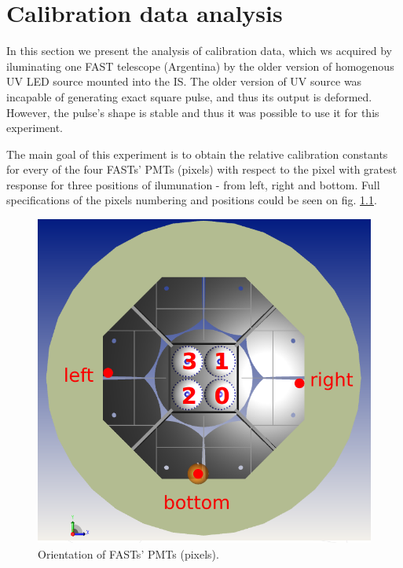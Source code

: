 
\chapter{Calibration data analysis}
In this section we present the analysis of calibration data, which ws acquired by iluminating one FAST telescope (Argentina) by the older version of homogenous UV LED source mounted into the IS. The older version of UV source was incapable of generating exact square pulse, and thus its output is deformed. However, the pulse's shape is stable and thus it was possible to use it for this experiment.   

\par
The main goal of this experiment is to obtain the relative calibration constants for every of the four FASTs' PMTs (pixels) with respect to the pixel with gratest response for three positions of ilumunation - from left, right and bottom. Full specifications of the pixels numbering and positions could be seen on fig. \ref{PMT orientation}.

\begin{figure}[H]
 \centering
 \includegraphics[scale=0.35, angle = 0]{./pictures/orientation2.png}
 \caption{Orientation of FASTs' PMTs (pixels).}
 \label{PMT orientation}
 
\end{figure}

